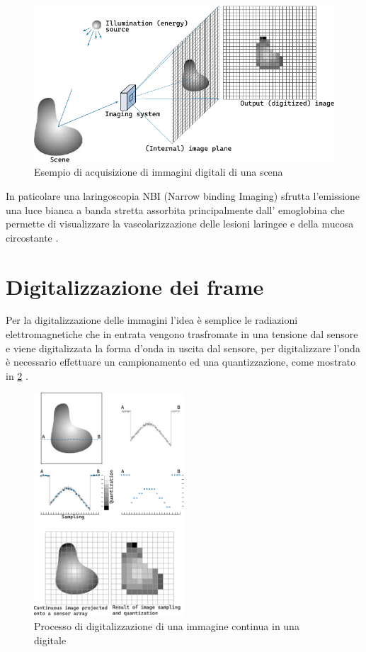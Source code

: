\begin{figure}[ht]
    \centering
    \includegraphics[width=1\textwidth]{frame/digital_image_acquisition.pdf}
    \caption{Esempio di acquisizione di immagini digitali di una scena}
    \label{fig:scena-acquisizione}
\end{figure}

In paticolare una laringoscopia NBI (Narrow binding Imaging)  sfrutta l’emissione una luce bianca a banda stretta assorbita principalmente dall’ emoglobina che permette  di visualizzare la vascolarizzazione delle lesioni laringee e della mucosa circostante \cite{giorgio_cenni_2008}. 

\section{Digitalizzazione dei frame}\label{digitalizzazione-dei-frame}

Per la digitalizzazione delle immagini l'idea è semplice le radiazioni elettromagnetiche che in entrata vengono trasfromate in una tensione dal sensore e viene digitalizzata la forma d'onda in uscita dal sensore, per digitalizzare l'onda è necessario effettuare un campionamento ed una quantizzazione, come mostrato in \cref{fig:campionamento-quantizzazione} \cite{gonzalez_dip}.

\begin{figure}[ht]
    \centering
    \includegraphics[width=0.5\textwidth]{frame/Sampling-Quantization.pdf}
    \caption{Processo di digitalizzazione di una immagine continua in una digitale}
    \label{fig:campionamento-quantizzazione}
\end{figure}

